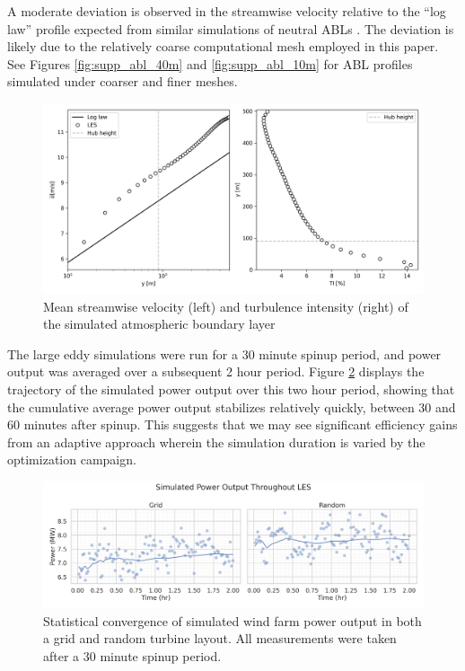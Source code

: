 \documentclass[11pt]{article}
\begin{document}
A moderate deviation is observed in the streamwise velocity relative to the
``log law'' profile expected from similar simulations of neutral ABLs \cite[pg.
191]{aryaIntroductionMicrometeorology2001}. The deviation is likely due to the
relatively coarse computational mesh employed in this paper. See Figures
\ref{fig:supp_abl_40m} and \ref{fig:supp_abl_10m} for ABL profiles simulated under
coarser and finer meshes.

\begin{figure}[htbp]
    \centering
    \includegraphics[scale=0.5]{precursor_stats.png}
    \caption{Mean streamwise velocity (left) and turbulence intensity (right)
    of the simulated atmospheric boundary layer}
    \label{fig:abl}
\end{figure}

The large eddy simulations were run for a $30$ minute spinup period, and power
output was averaged over a subsequent 2 hour period. Figure
\ref{fig:power_convergence} displays the trajectory of the simulated power
output over this two hour period, showing that the cumulative average power
output stabilizes relatively quickly, between 30 and 60 minutes after spinup.
This suggests that we may see significant efficiency gains from an adaptive approach
wherein the simulation duration is varied by the optimization campaign.

\begin{figure}[htbp]
    \centering
    \includegraphics[scale=0.4]{power_convergence.png}
    \caption{
    Statistical convergence of simulated wind farm power output in both a grid
    and random turbine layout. All measurements were taken after a
    30 minute spinup period.
    }
    \label{fig:power_convergence}
\end{figure}
\end{document}
